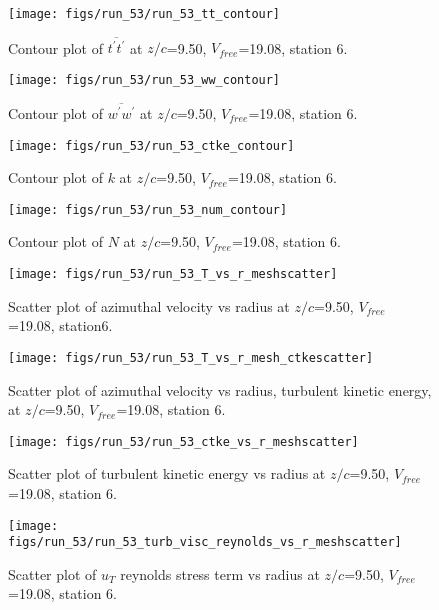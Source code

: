 \begin{figure}[H]
\centering
\texttt{[image: figs/run\_53/run\_53\_tt\_contour]}
\caption{Contour plot of $\overline{t^\prime t^\prime}$ at $z/c$=9.50, $V_{free}$=19.08, station 6.}
\end{figure}


\begin{figure}[H]
\centering
\texttt{[image: figs/run\_53/run\_53\_ww\_contour]}
\caption{Contour plot of $\overline{w^\prime w^\prime}$ at $z/c$=9.50, $V_{free}$=19.08, station 6.}
\end{figure}


\begin{figure}[H]
\centering
\texttt{[image: figs/run\_53/run\_53\_ctke\_contour]}
\caption{Contour plot of $k$ at $z/c$=9.50, $V_{free}$=19.08, station 6.}
\end{figure}


\begin{figure}[H]
\centering
\texttt{[image: figs/run\_53/run\_53\_num\_contour]}
\caption{Contour plot of $N$ at $z/c$=9.50, $V_{free}$=19.08, station 6.}
\end{figure}


\begin{figure}[H]
\centering
\texttt{[image: figs/run\_53/run\_53\_T\_vs\_r\_meshscatter]}
\caption{Scatter plot of azimuthal velocity vs radius at $z/c$=9.50, $V_{free}$=19.08, station6.}
\end{figure}


\begin{figure}[H]
\centering
\texttt{[image: figs/run\_53/run\_53\_T\_vs\_r\_mesh\_ctkescatter]}
\caption{Scatter plot of azimuthal velocity vs radius, turbulent kinetic energy, at $z/c$=9.50, $V_{free}$=19.08, station 6.}
\end{figure}


\begin{figure}[H]
\centering
\texttt{[image: figs/run\_53/run\_53\_ctke\_vs\_r\_meshscatter]}
\caption{Scatter plot of turbulent kinetic energy vs radius at $z/c$=9.50, $V_{free}$=19.08, station 6.}
\end{figure}


\begin{figure}[H]
\centering
\texttt{[image: figs/run\_53/run\_53\_turb\_visc\_reynolds\_vs\_r\_meshscatter]}
\caption{Scatter plot of $
u_T$ reynolds stress term vs radius at $z/c$=9.50, $V_{free}$=19.08, station 6.}
\end{figure}


